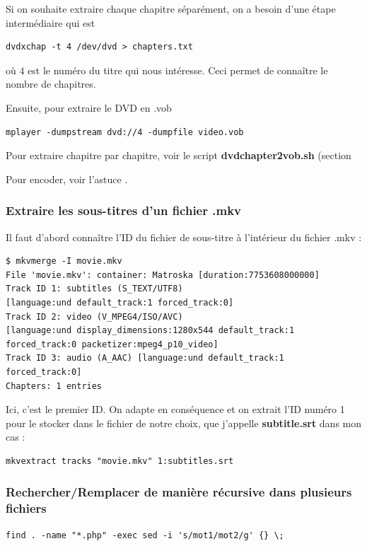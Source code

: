 \documentclass[a4paper,twoside]{article}
\begin{document}
\bigskip

Si on souhaite extraire chaque chapitre séparément, on a besoin d'une étape intermédiaire qui est
\begin{verbatim}
dvdxchap -t 4 /dev/dvd > chapters.txt
\end{verbatim}
où $4$ est le numéro du titre qui nous intéresse. Ceci permet de connaître le nombre de chapitres.

Ensuite, pour extraire le DVD en .vob
\begin{verbatim}
mplayer -dumpstream dvd://4 -dumpfile video.vob
\end{verbatim}

Pour extraire chapitre par chapitre, voir le script \textbf{dvdchapter2vob.sh} (section 

Pour encoder, voir l'astuce .

\subsubsection{Extraire les sous-titres d'un fichier .mkv}
Il faut d'abord connaître l'ID du fichier de sous-titre à l'intérieur du fichier .mkv : 
\begin{verbatim}
$ mkvmerge -I movie.mkv
File 'movie.mkv': container: Matroska [duration:7753608000000]
Track ID 1: subtitles (S_TEXT/UTF8) 
[language:und default_track:1 forced_track:0]
Track ID 2: video (V_MPEG4/ISO/AVC) 
[language:und display_dimensions:1280x544 default_track:1
forced_track:0 packetizer:mpeg4_p10_video]
Track ID 3: audio (A_AAC) [language:und default_track:1 forced_track:0]
Chapters: 1 entries
\end{verbatim}

Ici, c'est le premier ID. On adapte en conséquence et on extrait l'ID numéro 1 pour le stocker dans le fichier de notre choix, que j'appelle \textbf{subtitle.srt} dans mon cas : 
\begin{verbatim}
mkvextract tracks "movie.mkv" 1:subtitles.srt
\end{verbatim}

\subsubsection{Rechercher/Remplacer de manière récursive dans plusieurs fichiers}
\begin{verbatim}
find . -name "*.php" -exec sed -i 's/mot1/mot2/g' {} \;
\end{verbatim}
\end{document}
